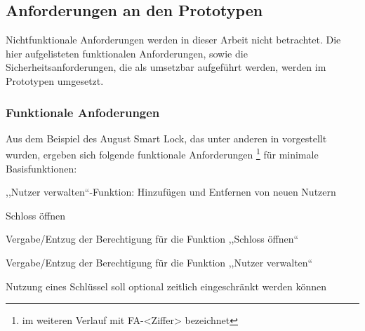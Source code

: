 \subsection{Anforderungen an den Prototypen}
\label{sec:prototype_requirements}
    Nichtfunktionale Anforderungen werden in dieser Arbeit nicht betrachtet. 
    Die hier aufgelisteten funktionalen Anforderungen, sowie die Sicherheitsanforderungen, die als umsetzbar aufgeführt werden, werden im Prototypen umgesetzt. 
    
\subsubsection{Funktionale Anfoderungen}
\label{sec:prototype_func_req}
    Aus dem Beispiel des August Smart Lock, das unter anderen in  vorgestellt wurden, ergeben sich folgende funktionale Anforderungen 
    \!\footnote{im weiteren Verlauf mit FA-<Ziffer> bezeichnet} 
    für minimale Basisfunktionen:
    \begin{FA}[noitemsep]
        \item \label{fa:1},,Nutzer verwalten``-Funktion: Hinzufügen und Entfernen von neuen Nutzern
        \item \label{fa:2}Schloss öffnen
        \item \label{fa:3}Vergabe/Entzug der Berechtigung für die Funktion ,,Schloss öffnen``
        \item \label{fa:4}Vergabe/Entzug der Berechtigung für die Funktion ,,Nutzer verwalten``
        \item \label{fa:5}Nutzung eines Schlüssel soll optional zeitlich eingeschränkt werden können
    \end{FA}

